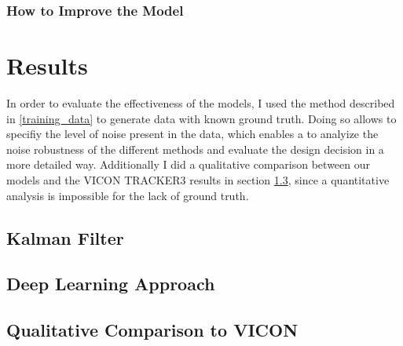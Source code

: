 \documentclass{article}
\begin{document}
\subsubsection{How to Improve the Model}

\section{Results}
\label{results}

In order to evaluate the effectiveness of the models, I used the method described in \ref{training_data} to generate data with known ground truth. Doing so allows to specifiy the level of noise present in the data, which enables a to analyize the noise robustness of the different methods and evaluate the design decision in a more detailed way. Additionally I did a qualitative comparison between our models and the VICON TRACKER3 results in section \ref{comparison_vicon}, since a quantitative analysis is impossible for the lack of ground truth.

\subsection{Kalman Filter}
\label{results_kalman_filter}

\subsection{Deep Learning Approach}
\label{results_dl}




\subsection{Qualitative Comparison to VICON}
\label{comparison_vicon}
\end{document}
